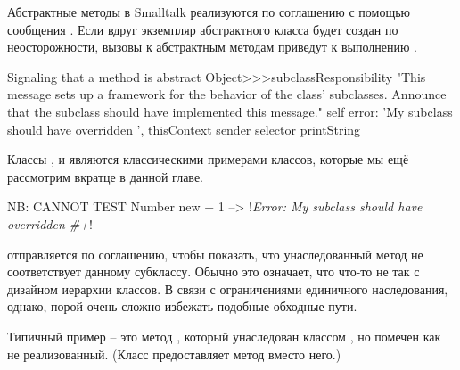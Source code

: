 \documentclass[a4paper,10pt,twoside]{book}
\begin{document}
Абстрактные методы в Smalltalk реализуются по соглашению с помощью сообщения . Если вдруг экземпляр абстрактного класса будет создан по неосторожности, вызовы к абстрактным методам приведут к выполнению .

\begin{method}{Signaling that a method is abstract}
Object>>>subclassResponsibility
    "This message sets up a framework for the behavior of the class' subclasses.
    Announce that the subclass should have implemented this message."
    self error: 'My subclass should have overridden ', thisContext sender selector printString
\end{method}

Классы ,  и  являются классическими примерами  классов, которые мы ещё рассмотрим вкратце в данной главе.

\begin{code}{NB: CANNOT TEST}
Number new + 1 --> !\emph{Error: My subclass should have overridden \#+}!
\end{code}

 отправляется по соглашению, чтобы показать, что унаследованный метод не соответствует данному субклассу. Обычно это означает, что что-то не так с дизайном иерархии классов. В связи с ограничениями единичного наследования, однако, порой очень сложно избежать подобные обходные пути. 

Типичный пример -- это метод , который унаследован классом , но помечен как не реализованный. (Класс  предоставляет метод  вместо него.)
\end{document}
